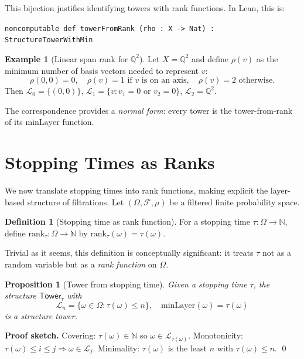 \documentclass[11pt]{article}
\newtheorem{proposition}[theorem]{Proposition}
\theoremstyle{definition}
\newtheorem{definition}[theorem]{Definition}
\newtheorem{example}[theorem]{Example}
\theoremstyle{remark}
\newcommand{\layer}{\mathcal{L}}
\newcommand{\minLayer}{\mathrm{minLayer}}
\newcommand{\rank}{\mathrm{rank}}
\newcommand{\Tower}{\mathsf{Tower}}
\newcommand{\Filtration}{\mathcal{F}}
\newcommand{\NN}{\mathbb{N}}
\newcommand{\QQ}{\mathbb{Q}}
\begin{document}
This bijection justifies identifying towers with rank functions.
In Lean, this is:

\texttt{noncomputable def towerFromRank (rho : X -> Nat) : StructureTowerWithMin}

\begin{example}[Linear span rank for $\QQ^2$]
\label{ex:vec2q}
Let $X = \QQ^2$ and define $\rho(v)$ as the minimum number of basis vectors needed to represent $v$:
\[
\rho(0,0) = 0, \quad \rho(v) = 1 \text{ if $v$ is on an axis}, \quad \rho(v) = 2 \text{ otherwise}.
\]
Then $\layer_0 = \{(0,0)\}$, $\layer_1 = \{v : v_1 = 0 \text{ or } v_2 = 0\}$, $\layer_2 = \QQ^2$.
\end{example}

The correspondence provides a \emph{normal form}: every tower is the tower-from-rank of its $\minLayer$ function.

\section{Stopping Times as Ranks}
\label{sec:stopping-rank}

We now translate stopping times into rank functions, making explicit the layer-based structure of filtrations.
Let $(\Omega, \Filtration, \mu)$ be a filtered finite probability space.

\begin{definition}[Stopping time as rank function]
\label{def:stopping-as-rank}
For a stopping time $\tau: \Omega \to \NN$, define $\rank_\tau: \Omega \to \NN$ by $\rank_\tau(\omega) = \tau(\omega)$.
\end{definition}

Trivial as it seems, this definition is conceptually significant: it treats $\tau$ not as a random variable but as a \emph{rank function} on $\Omega$.

\begin{proposition}[Tower from stopping time]
\label{prop:tower-from-stopping-time}
Given a stopping time $\tau$, the structure $\Tower_\tau$ with
\[
\layer_n = \{\omega \in \Omega : \tau(\omega) \leq n\}, \quad \minLayer(\omega) = \tau(\omega)
\]
is a structure tower.
\end{proposition}

\noindent\textbf{Proof sketch.}
Covering: $\tau(\omega) \in \NN$ so $\omega \in \layer_{\tau(\omega)}$.
Monotonicity: $\tau(\omega) \leq i \leq j \Rightarrow \omega \in \layer_j$.
Minimality: $\tau(\omega)$ is the least $n$ with $\tau(\omega) \leq n$.
\qed
\end{document}
